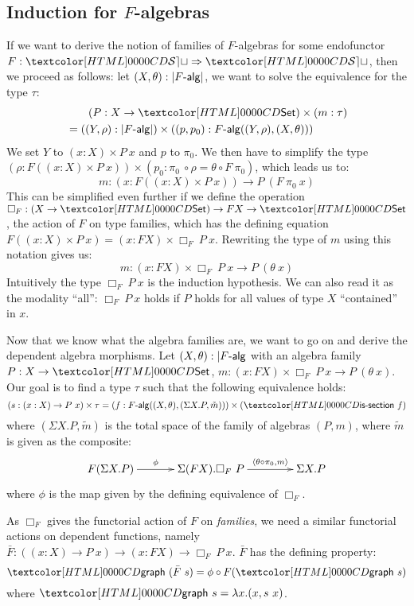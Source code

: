 \subsection{Induction for $F$-algebras}
\label{induction-for-f-algebras}
If we want to derive the notion of families of $F$-algebras for some
endofunctor $F : \Func{\SET}{\SET}$, then we proceed as follows: let
$(X,\theta) : | \algcat{F} |$, we want to solve the equivalence for
the type $\tau$:
%
\begin{align*}
&\ \ \ \ \ \ (P : X \to \Set) \times (m : \tau) \\
&= ((Y,\rho) : | \algcat{F} |) \times ((p,p_0) : \algcat{F}((Y,\rho),(X,\theta)))  
\end{align*}
%
We set $Y$ to $(x : X) \times P\ x$ and $p$ to $\pi_0$. We then have
to simplify the type
$(\rho : F ((x : X) \times P\ x)) \times (p_0 : \pi_0\ \circ \rho =
\theta \circ F\ \pi_0)$, which leads us to:
$$
m : (x : F ((x : X) \times P\ x)) \to P\ (F\ \pi_0\ x)
$$
This can be simplified even further if we define the operation
$\Box_F : (X \to \Set) \to FX \to \Set$, \ie the action of $F$ on type
families, which has the defining equation
$F ((x : X) \times P\ x) = (x : FX) \times \Box_F\ P\
x$. Rewriting the type of $m$ using this notation gives us:
$$
m : (x : FX) \times \Box_F\ P\ x \to P\ (\theta\ x)
$$
Intuitively the type $\Box_F\ P\ x$ is the induction hypothesis. We
can also read it as the modality ``all'': $\Box_F\ P\ x$ holds if $P$
holds for all values of type $X$ ``contained'' in $x$.

Now that we know what the algebra families are, we want to go on and
derive the dependent algebra morphisms. Let
$(X,\theta) : | \algcat{F}$ with an algebra family $P : X \to \Set$,
$m : (x : FX) \times \Box_F\ P\ x \to P\ (\theta\ x)$. Our goal is to
find a type $\tau$ such that the following equivalence holds:
$$
(s : (x : X) \to P\ x) \times \tau = (f : \algcat{F}((X,\theta),(\Sigma X . P , \tilde{m}))) \times (\issection\ f)
$$
where $(\Sigma X . P , \tilde{m})$ is the total space of the family of
algebras $(P,m)$, where $\tilde{m}$ is given as the composite:
$$
\xymatrix@!C{
  F (\Sigma X . P)
  \ar[r]^-{\phi}
  &\Sigma (FX) . \Box_F\ P
  \ar[r]^-{\langle \theta \circ \pi_0 , m \rangle}
  &\Sigma X . P
}
$$
where $\phi$ is the map given by the defining equivalence of $\Box_F$.

As $\Box_F$ gives the functorial action of $F$ on \emph{families}, we
need a similar functorial actions on dependent functions, namely
$\bar{F} : ((x : X) \to P\ x) \to (x : FX) \to \Box_F\ P\
x$. $\bar{F}$ has the defining property:
$$
\grph\ (\bar{F}\ s) = \phi \circ F (\grph\ s)
$$
where $\grph\ s = \lambda x . (x , s\ x)$.

